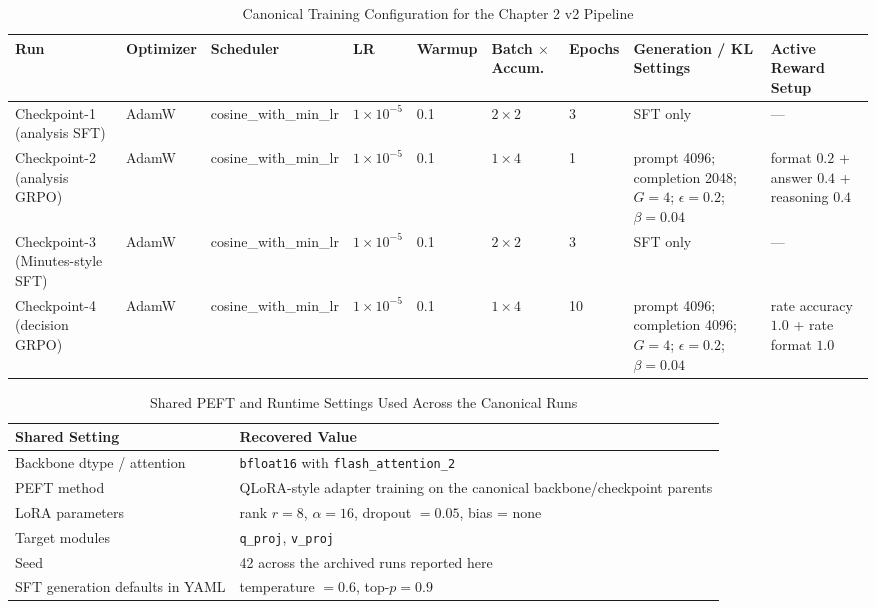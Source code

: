 \begin{table}[htbp]
    \centering
    \scriptsize
    \begin{tabular}{p{} p{} p{} p{} p{} p{} p{} p{} p{}}
    \toprule
    \textbf{Run} & \textbf{Optimizer} & \textbf{Scheduler} & \textbf{LR} & \textbf{Warmup} & \textbf{Batch $\times$ Accum.} & \textbf{Epochs} & \textbf{Generation / KL Settings} & \textbf{Active Reward Setup} \\
    \midrule
    Checkpoint-1 (analysis SFT) & AdamW & cosine\_with\_min\_lr & $1\times10^{-5}$ & 0.1 & $2\times2$ & 3 & SFT only & --- \\
    Checkpoint-2 (analysis GRPO) & AdamW & cosine\_with\_min\_lr & $1\times10^{-5}$ & 0.1 & $1\times4$ & 1 & prompt 4096; completion 2048; $G=4$; $\epsilon=0.2$; $\beta=0.04$ & format $0.2$ + answer $0.4$ + reasoning $0.4$ \\
    Checkpoint-3 (Minutes-style SFT) & AdamW & cosine\_with\_min\_lr & $1\times10^{-5}$ & 0.1 & $2\times2$ & 3 & SFT only & --- \\
    Checkpoint-4 (decision GRPO) & AdamW & cosine\_with\_min\_lr & $1\times10^{-5}$ & 0.1 & $1\times4$ & 10 & prompt 4096; completion 4096; $G=4$; $\epsilon=0.2$; $\beta=0.04$ & rate accuracy $1.0$ + rate format $1.0$ \\
    \bottomrule
    \end{tabular}
    \caption{Canonical Training Configuration for the Chapter 2 v2 Pipeline}
    \label{tab:ch2:training_config_summary}
\end{table}

\begin{table}[htbp]
    \centering
    \footnotesize
    \begin{tabular}{p{} p{}}
    \toprule
    \textbf{Shared Setting} & \textbf{Recovered Value} \\
    \midrule
    Backbone dtype / attention & \texttt{bfloat16} with \texttt{flash\_attention\_2} \\
    PEFT method & QLoRA-style adapter training on the canonical backbone/checkpoint parents \\
    LoRA parameters & rank $r=8$, $\alpha=16$, dropout $=0.05$, bias = none \\
    Target modules & \texttt{q\_proj}, \texttt{v\_proj} \\
    Seed & 42 across the archived runs reported here \\
    SFT generation defaults in YAML & temperature $=0.6$, top-$p=0.9$ \\
    \bottomrule
    \end{tabular}
    \caption{Shared PEFT and Runtime Settings Used Across the Canonical Runs}
    \label{tab:ch2:shared_training_settings}
\end{table}


